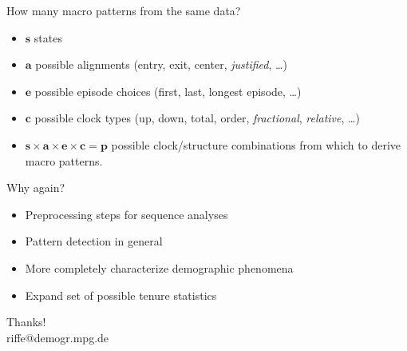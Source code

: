\documentclass[20pt,usenames,dvipsnames]{beamer}
\begin{document}
\begin{frame}[plain]
\Large
\begin{center}
How many macro patterns from the same data?
\begin{itemize}[<+->]
\item $\textbf{s}$ states
\item $\textbf{a}$ possible alignments (entry, exit, center, \emph{justified}, \ldots)
\item $\textbf{e}$ possible episode choices (first, last, longest episode, \ldots)
\item $\textbf{c}$ possible clock types (up, down, total, order, \emph{fractional}, \emph{relative}, \ldots)
\item $\textbf{s}\times \textbf{a}\times \textbf{e}\times \textbf{c} = \textbf{p}$ possible clock/structure combinations from which to derive macro patterns.
\end{itemize}
\end{center}
\end{frame}
%
\begin{frame}[plain]
\Large
\begin{center}
Why again?
\begin{itemize}[<+->]
\item Preprocessing steps for sequence analyses
\item Pattern detection in general 
\item More completely characterize demographic phenomena 
\item Expand set of possible tenure statistics
\end{itemize}
\pause
Thanks!\\
riffe@demogr.mpg.de
\end{center}


\end{frame}
%



\end{document}
